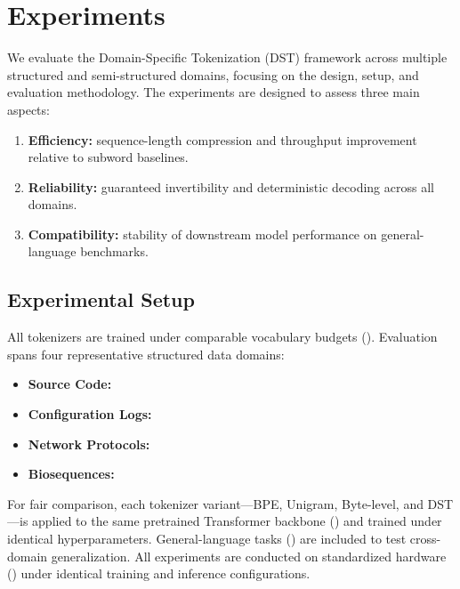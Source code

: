 \section{Experiments}
\label{sec:experiments}

We evaluate the Domain-Specific Tokenization (DST) framework across multiple structured and semi-structured domains, focusing on the design, setup, and evaluation methodology.
The experiments are designed to assess three main aspects:

\begin{enumerate}
  \item \textbf{Efficiency:} sequence-length compression and throughput improvement relative to subword baselines.
  \item \textbf{Reliability:} guaranteed invertibility and deterministic decoding across all domains.
  \item \textbf{Compatibility:} stability of downstream model performance on general-language benchmarks.
\end{enumerate}

\subsection{Experimental Setup}

All tokenizers are trained under comparable vocabulary budgets ().
Evaluation spans four representative structured data domains:

\begin{itemize}
  \item \textbf{Source Code:} 
  \item \textbf{Configuration Logs:} 
  \item \textbf{Network Protocols:} 
  \item \textbf{Biosequences:} 
\end{itemize}

For fair comparison, each tokenizer variant—BPE, Unigram, Byte-level, and DST—is applied to the same pretrained Transformer backbone () and trained under identical hyperparameters.
General-language tasks () are included to test cross-domain generalization.
All experiments are conducted on standardized hardware () under identical training and inference configurations.


